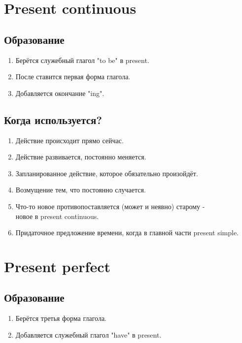 \documentclass[oneside]{book}
\begin{document}
    \section{Present continuous}
    \subsection{Образование}
    \begin{enumerate}
        \item Берётся служебный глагол "to be"{ }в present.
        \item После ставится первая форма глагола.
        \item Добавляется окончание "ing".
    \end{enumerate}

    \subsection{Когда используется?}
    \begin{enumerate}
        \item Действие происходит прямо сейчас.

        \item Действие развивается, постоянно меняется.

        \item Запланированное действие, которое обязательно произойдёт.

        \item Возмущение тем, что постоянно случается.

        \item Что-то новое противопоставляется (может и неявно) старому - \\
        новое в present continuous.

        \item Придаточное предложение времени, когда в главной части present simple.
    \end{enumerate}

    \section{Present perfect}
    \subsection{Образование}
    \begin{enumerate}
        \item Берётся третья форма глагола.
        \item Добавляется служебный глагол "have"{ }в present.
    \end{enumerate}
\end{document}
